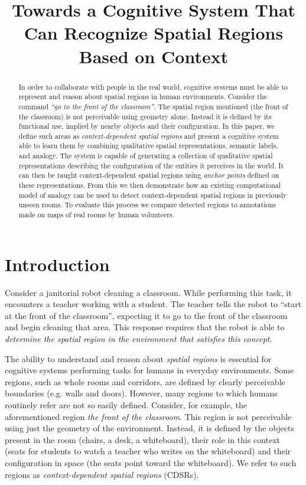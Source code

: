 \documentclass[letterpaper]{article}
\begin{document}
\title{Towards a Cognitive System That Can Recognize Spatial Regions Based on Context}

\author{}


\maketitle
\begin{abstract}
In order to collaborate with people in the real world, cognitive systems must be able to represent and reason about spatial regions in human environments. Consider the command \emph{``go to the front of the classroom''}. The spatial region mentioned (the front of the classroom) is not perceivable using geometry alone. Instead it is defined by its functional use, implied by nearby objects and their configuration. In this paper, we define such areas as \textit{context-dependent spatial regions} and present a cognitive system able to learn them by combining qualitative spatial representations, semantic labels, and analogy. The system is capable of generating a collection of qualitative spatial representations describing the configuration of the entities it perceives in the world. It can then be taught context-dependent spatial regions using \textit{anchor points} defined on these representations.  From this we then demonstrate how an existing computational model of analogy can be used to detect context-dependent spatial regions in previously unseen rooms. To evaluate this process we compare detected regions to annotations made on maps of real rooms by human volunteers.
\end{abstract}

\section{Introduction}

Consider a janitorial robot cleaning a classroom. While performing this task, it encounters a teacher working with a student. The teacher tells the robot to ``start at the front of the classroom'', expecting it to go to the front of the classroom and begin cleaning that area. This response requires that the robot is able to \emph{determine the spatial region in the environment that satisfies this concept}.

The ability to understand and reason about \textit{spatial regions} is essential for cognitive systems performing tasks for humans in everyday environments. Some regions, such as whole rooms and corridors, are defined by clearly perceivable boundaries (e.g. walls and doors). However, many regions to which humans routinely refer are not so easily defined. Consider, for example, the aforementioned region \textit{the front of the classroom}. This region is not perceivable using just the geometry of the environment. Instead, it is defined by the objects present in the room (chairs, a desk, a whiteboard), their role in this context (seats for students to watch a teacher who writes on the whiteboard) and their configuration in space (the seats point toward the whiteboard). We refer to such regions as \textit{context-dependent spatial regions} (CDSRs). 
\end{document}
